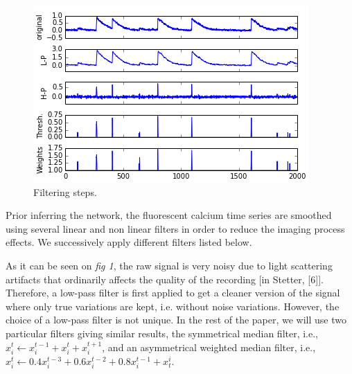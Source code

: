 \documentclass[wcp]{jmlr}
\begin{document}
\begin{figure}%
\caption{Filtering steps.}\label{wrap-fig:1}
\includegraphics[width=\linewidth]{images/fig_filtering_recut.png}
\end{figure}


Prior inferring the network, the fluorescent calcium time series
are smoothed using several linear and non linear filters in
order to reduce the imaging process effects. We successively apply different
filters listed below.



As it can be seen on \textit{fig 1}, the raw signal is very noisy due to light scattering artifacts that ordinarily affects the quality of the recording [in Stetter, [6]]. Therefore, a low-pass filter is first applied to get a cleaner version of the signal where only
true variations are kept, i.e. without noise variations. However, the choice of a low-pass
filter is not unique. In the rest of the paper, we will use two particular filters giving similar results, the
symmetrical median filter, i.e., $x^t_i \leftarrow x^{t-1}_i + x^{t}_i + x^{t+1}_i$,
and an asymmetrical weighted median filter, i.e.,
$x^t_i \leftarrow 0.4 x^{t-3}_i + 0.6 x^{t-2}_i + 0.8 x^{t-1}_i + x_{t}^i$.
\end{document}
